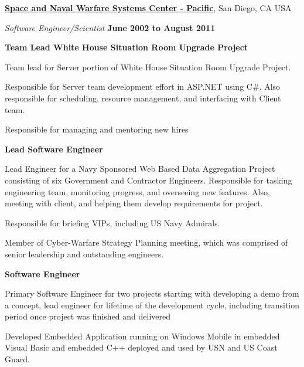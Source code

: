 \documentclass[10pt]{article}
\begin{document}
\href{http://www.spawar.navy.mil/}{\textbf{Space and Naval Warfare Systems Center - Pacific}},
San Diego, CA USA
\begin{outerlist}
\item[] \textit{Software Engineer/Scientist}%
    \hfill \textbf{June 2002 to August 2011}
    \begin{innerlist}%
    \item \textbf{Team Lead White House Situation Room Upgrade Project}
    \begin{innerlist}%
    \item Team lead for Server portion of White House Situation Room Upgrade Project.
  \item Responsible for Server team development effort in ASP.NET using C\#. Also responsible for scheduling, resource management, and interfacing with Client team. 
  \item Responsible for managing and mentoring new hires 
	\end{innerlist}
	
	\item \textbf{Lead Software Engineer}
    \begin{innerlist}%
    \item Lead Engineer for a Navy Sponsored Web Based Data Aggregation Project consisting of six Government and Contractor Engineers.  Responsible for tasking engineering team, monitoring progress, and overseeing new features. Also, meeting with client, and helping them develop requirements for project.  
  \item Responsible for briefing VIPs, including US Navy Admirals.
  \item Member of Cyber-Warfare Strategy Planning meeting, which was comprised of senior leadership and outstanding engineers.
	\end{innerlist}
	
		\item \textbf{Software Engineer}
    \begin{innerlist}%
\item Primary Software Engineer for two projects starting with developing a demo from a concept, lead engineer for lifetime of the development cycle, including transition period once project was finished and delivered
  \item Developed Embedded Application running on Windows Mobile in embedded Visual Basic and embedded C++ deployed and used by USN and US Coast Guard.
	\end{innerlist}



\end{innerlist}
\end{outerlist}
\end{document}
